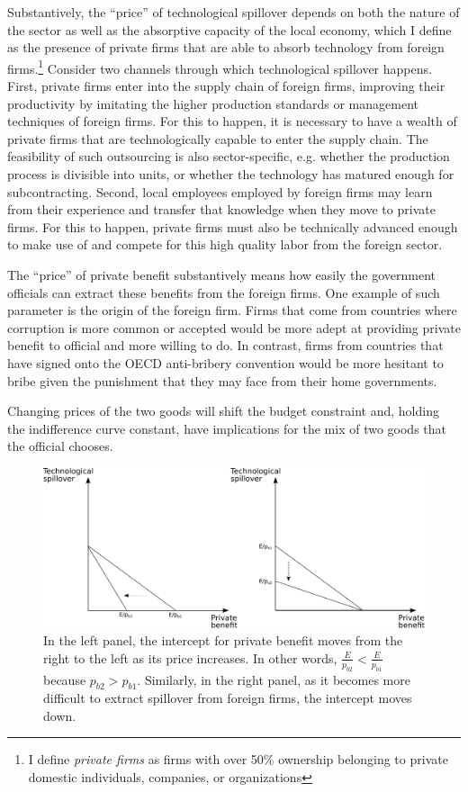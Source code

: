 Substantively, the ``price'' of technological spillover depends on both the nature of the sector as well as the absorptive capacity of the local economy, which I define as the presence of private firms that are able to absorb technology from foreign firms.\footnote{I define \textit{private firms} as firms with over 50\% ownership belonging to private domestic individuals, companies, or organizations} Consider two channels through which technological spillover happens. First, private firms enter into the supply chain of foreign firms, improving their productivity by imitating the higher production standards or management techniques of foreign firms. For this to happen, it is necessary to have a wealth of private firms that are technologically capable to enter the supply chain. The feasibility of such outsourcing is also sector-specific, e.g. whether the production process is divisible into units, or whether the technology has matured enough for subcontracting. Second, local employees employed by foreign firms may learn from their experience and transfer that knowledge when they move to private firms. For this to happen, private firms must also be technically advanced enough to make use of and compete for this high quality labor from the foreign sector.

The ``price'' of private benefit substantively means how easily the government officials can extract these benefits from the foreign firms. One example of such parameter is the origin of the foreign firm. Firms that come from countries where corruption is more common or accepted would be more adept at providing private benefit to official and more willing to do. In contrast, firms from countries that have signed onto the OECD anti-bribery convention would be more hesitant to bribe given the punishment that they may face from their home governments.

Changing prices of the two goods will shift the budget constraint and, holding the indifference curve constant, have implications for the mix of two goods that the official chooses.

\begin{figure}[!ht]
	\centering
    \includegraphics[width=\textwidth, height=\textheight,keepaspectratio]{../figure/absorptive_capacity}
    \caption{In the left panel, the intercept for private benefit moves from the right to the left as its price increases. In other words, $\frac{E}{p_{b2}} < \frac{E}{p_{b1}}$ because $p_{b2} > p_{b1}$. Similarly, in the right panel, as it becomes more difficult to extract spillover from foreign firms, the intercept moves down.}
    \label{fig:relative_price}
\end{figure}

